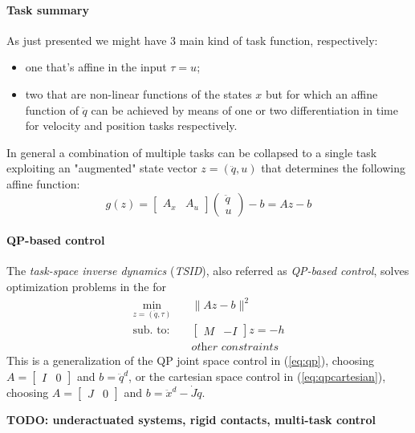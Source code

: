 	\paragraph{Task summary} As just presented we might have 3 main kind of task function, respectively:
	\begin{itemize}
		\item one that's affine in the input $\tau = u$;
		\item two that are non-linear functions of the states $x$ but for which an affine function of $\ddot q$ can be achieved by means of one or two differentiation in time for velocity and position tasks respectively.
	\end{itemize}
	In general a combination of multiple tasks can be collapsed to a single task exploiting an "augmented" state vector $z = (\ddot q, u)$ that determines the following affine function:
	\[ g(z) = \begin{bmatrix}
		A_x & A_u
	\end{bmatrix} \begin{pmatrix}
		\ddot q \\ u
	\end{pmatrix} - b = Az - b \]
	
	\paragraph{QP-based control} The \textit{task-space inverse dynamics} (\textit{TSID}), also referred as \textit{QP-based control}, solves optimization problems in the for
	\begin{equation}
	\begin{aligned}
		\min_{z =(\ddot q, \tau)} \quad & \big\|Az-b \big\|^2 \\
		\textrm{sub. to:} \quad & \begin{bmatrix}
			M & -I
		\end{bmatrix} z = -h \\ 
		& \textit{other constraints}
	\end{aligned}
	\end{equation}
	This is a generalization of the QP joint space control in (\ref{eq:qp}), choosing $A = \begin{bmatrix} I & 0 \end{bmatrix}$ and $b = \ddot q^d$, or the cartesian space control in (\ref{eq:qpcartesian}), choosing $A = \begin{bmatrix} J & 0 \end{bmatrix}$ and $b = \ddot x^d - \dot J \dot q$.
	
	\textbf{TODO: underactuated systems, rigid contacts, multi-task control}
	
 	
	
	